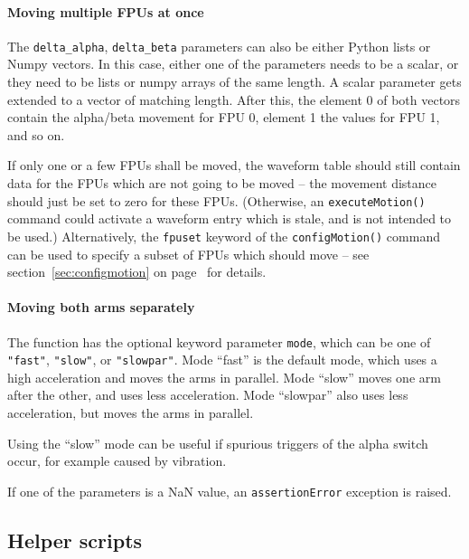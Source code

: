 \documentclass[11pt,a4paper]{scrartcl}
\begin{document}
\paragraph{Moving multiple FPUs at once}
 The
\verb+delta_alpha+, \verb+delta_beta+ parameters can also be either
Python lists or Numpy vectors. In this case, either one of the
parameters needs to be a scalar, or they need to be lists or numpy
arrays of the same length. A scalar parameter gets extended to a
vector of matching length. After this, the element 0 of both vectors
contain the alpha/beta movement for FPU 0, element 1 the values for
FPU 1, and so on.

If only one or a few FPUs shall be moved, the waveform table should
still contain data for the FPUs which are not going to be moved -- the
movement distance should just be set to zero for these FPUs.
(Otherwise, an \texttt{executeMotion()} command could activate a
waveform entry which is stale, and is not intended to be used.)
Alternatively, the \texttt{fpuset} keyword of the
\texttt{configMotion()} command can be used to specify a subset of FPUs
which should move -- see section~\ref{sec:configmotion} on
page~\pageref{sec:configmotion} for details.

\paragraph{Moving both arms separately}

The function has the optional keyword parameter \texttt{mode}, which
can be one of \texttt{"fast"}, \texttt{"slow"}, or \texttt{"slowpar"}.
Mode ``fast'' is the default mode, which uses a high acceleration and
moves the arms in parallel. Mode ``slow'' moves one arm after the
other, and uses less acceleration. Mode ``slowpar'' also uses less
acceleration, but moves the arms in parallel.

Using the ``slow'' mode can be useful if spurious triggers of the
alpha switch occur, for example caused by vibration.

If one of the parameters is a NaN value, an \texttt{assertionError}
exception is raised.

\subsection{Helper scripts}
\end{document}
